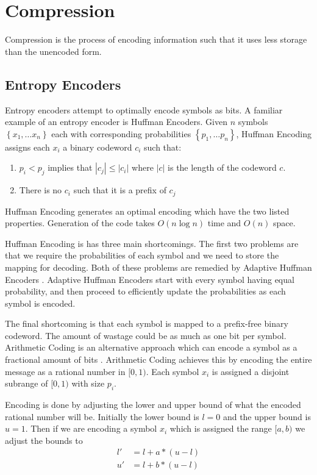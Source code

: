 \documentclass{report}
\begin{document}
\section{Compression}

Compression is the process of encoding information such that it uses less
storage than the unencoded form.


\subsection{Entropy Encoders}

Entropy encoders attempt to optimally encode symbols as bits. A familiar
example of an entropy encoder is Huffman Encoders. Given $n$ symbols
$\left\{x_1, \dots x_n \right\}$ each with corresponding probabilities
$\left\{p_1, \dots p_n \right\}$, Huffman Encoding assigns each $x_i$ a binary
codeword $c_i$ such that:
\begin{enumerate}
  \item $p_i < p_j$ implies that $|c_j| \le |c_i|$ where $|c|$ is the length
    of the codeword $c$.
  \item There is no $c_i$ such that it is a prefix of $c_j$
\end{enumerate}
\citep{huffman1952method}

Huffman Encoding generates an optimal encoding which have the two listed
properties. Generation of the code takes $O(n \log n)$ time and $O(n)$ space.

Huffman Encoding is has three main shortcomings. The first two problems are
that we require the probabilities of each symbol and we need to store the
mapping for decoding. Both of these problems are remedied by Adaptive Huffman
Encoders \citep{drozdek,vitter1987}. Adaptive Huffman Encoders start with
every symbol having equal probability, and then proceed to efficiently update
the probabilities as each symbol is encoded.

The final shortcoming is that each symbol is mapped to a prefix-free binary
codeword. The amount of wastage could be as much as one bit per
symbol. Arithmetic Coding is an alternative approach which can encode a symbol
as a fractional amount of bits \citep{drozdek}. Arithmetic Coding achieves
this by encoding the entire message as a rational number in $[0,1)$. Each
  symbol $x_i$ is assigned a disjoint subrange of $[0,1)$ with size $p_i$.

Encoding is done by adjusting the lower and upper bound of what the encoded
rational number will be. Initially the lower bound is $l=0$ and the upper
bound is $u=1$. Then if we are encoding a symbol $x_i$ which is assigned the
range $[a,b)$ we adjust the bounds to
\begin{align*}
  l' & = l + a * (u-l) \\
  u' & = l + b * (u-l)
\end{align*}
\end{document}
